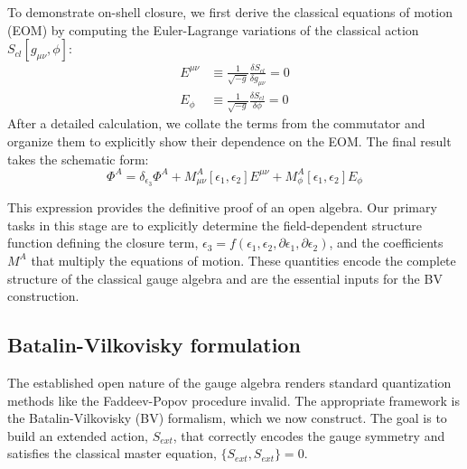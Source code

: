 \documentclass[twocolumn]{aastex631}
\begin{document}
To demonstrate on-shell closure, we first derive the classical equations of motion (EOM) by computing the Euler-Lagrange variations of the classical action $S_{cl}[g_{\mu\nu},\phi]$:
\begin{align}
E^{\mu\nu} &\equiv \frac{1}{\sqrt{-g}} \frac{\delta S_{cl}}{\delta g_{\mu\nu}} = 0 \\
E_{\phi} &\equiv \frac{1}{\sqrt{-g}} \frac{\delta S_{cl}}{\delta \phi} = 0
\end{align}
After a detailed calculation, we collate the terms from the commutator and organize them to explicitly show their dependence on the EOM. The final result takes the schematic form:
\begin{equation}
[\delta_{\epsilon_1}, \delta_{\epsilon_2}] \Phi^A = \delta_{\epsilon_3} \Phi^A + M^A_{\mu\nu}[\epsilon_1, \epsilon_2] E^{\mu\nu} + M^A_{\phi}[\epsilon_1, \epsilon_2] E_{\phi}
\end{equation}

This expression provides the definitive proof of an open algebra. Our primary tasks in this stage are to explicitly determine the field-dependent structure function defining the closure term, $\epsilon_3 = f(\epsilon_1, \epsilon_2, \partial\epsilon_1, \partial\epsilon_2)$, and the coefficients $M^A$ that multiply the equations of motion. These quantities encode the complete structure of the classical gauge algebra and are the essential inputs for the BV construction.

\subsection{Batalin-Vilkovisky formulation}
The established open nature of the gauge algebra renders standard quantization methods like the Faddeev-Popov procedure invalid. The appropriate framework is the Batalin-Vilkovisky (BV) formalism, which we now construct. The goal is to build an extended action, $S_{ext}$, that correctly encodes the gauge symmetry and satisfies the classical master equation, $\{S_{ext}, S_{ext}\} = 0$.
\end{document}
